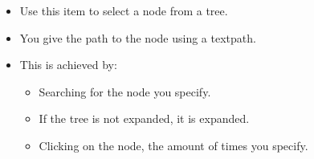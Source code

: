 
\begin{itemize}
\item Use this item to select a node from a tree.
\item You give the path to the node using a textpath.
\item This is achieved by:
\begin{itemize}
\item Searching for the node you specify.
\item If the tree is not expanded, it is expanded.
\item Clicking on the node, the amount of times you specify. 
\end{itemize}
\end{itemize}

